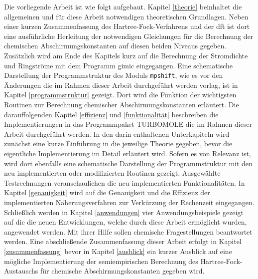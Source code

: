\bigskip
Die vorliegende Arbeit ist wie folgt aufgebaut. Kapitel \ref{theorie} beinhaltet die allgemeinen und für diese Arbeit notwendigen theoretischen Grundlagen. Neben einer kurzen Zusammenfassung des Hartree-Fock-Verfahrens und der \ac{dft} ist dort eine ausführliche Herleitung der notwendigen Gleichungen für die Berechnung der chemischen Abschirmungskonstanten auf diesen beiden Niveaus gegeben. Zusätzlich wird am Ende des Kapitels kurz auf die Berechnung der Stromdichte und Ringströme mit dem Programm \ac{gimic} eingegangen. Eine schematische Darstellung der Programmstruktur des Moduls \texttt{mpshift}, wie es vor den Änderungen die im Rahmen dieser Arbeit durchgeführt werden vorlag, ist in Kapitel \ref{programmstruktur} gezeigt. Dort wird die Funktion der wichtigsten Routinen zur Berechnung chemischer Abschirmungskonstanten erläutert. Die darauffolgenden Kapitel \ref{effizienz} und \ref{funktionalität} beschreiben die Implementierungen in das Programmpaket \textsc{TURBOMOLE} die im Rahmen dieser Arbeit durchgeführt werden. In den darin enthaltenen Unterkapiteln wird zunächst eine kurze Einführung in die jeweilige Theorie gegeben, bevor die eigentliche Implementierung im Detail erläutert wird. Sofern es von Relevanz ist, wird dort ebenfalls eine schematische Darstellung der Programmstruktur mit den neu implementierten oder modifizierten Routinen gezeigt. Ausgewählte Testrechnungen veranschaulichen die neu implementierten Funktionalitäten. In Kapitel \ref{genauigkeit} wird auf die Genauigkeit und die Effizienz der implementierten Näherungsverfahren zur Verkürzung der Rechenzeit eingegangen. Schließlich werden in Kapitel \ref{anwendungen} vier Anwendungsbeispiele gezeigt auf die die neuen Entwicklungen, welche durch diese Arbeit ermöglicht wurden, angewendet werden. Mit ihrer Hilfe sollen chemische Fragestellungen beantwortet werden. Eine abschließende Zusammenfassung dieser Arbeit erfolgt in Kapitel \ref{zusammenfassung} bevor in Kapitel \ref{ausblick} ein kurzer Ausblick auf eine mögliche Implementierung der semiempirischen Berechnung des Hartree-Fock-Austauschs für chemische Abschirmungskonstanten gegeben wird.